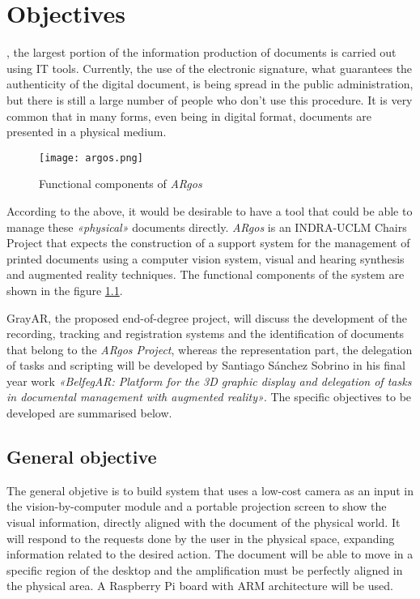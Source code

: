 \chapter{Objectives}
\label{chap:objetivos_eng}

, the largest portion of the information production of documents is carried out using IT tools. Currently, the use of the electronic signature, what guarantees the authenticity of the digital document, is being spread in the public administration, but there is still a large number of people who don't use this procedure. It is very common that in many forms, even being in digital format, documents are presented in a physical medium.

\begin{figure}[h!]
  \begin{center}
      \texttt{[image: argos.png]}
      \caption{Functional components of \textit{ARgos}}
      \label{fig:diagrama_argos_eng}
    \end{center}
\end{figure}

According to the above, it would be desirable to have a tool that could be able to manage these \textit{«physical»} documents directly. \textit{ARgos} is an INDRA-UCLM Chairs Project that expects the construction of a support system for the management of printed documents using a computer vision system, visual and hearing synthesis and augmented reality techniques. The functional components of the system are shown in the figure \ref{fig:diagrama_argos_eng}.

GrayAR, the proposed end-of-degree project, will discuss the development of the recording, tracking and registration systems and the identification of documents that belong to the \textit{ARgos Project}, whereas the representation part, the delegation of tasks and scripting will be developed by Santiago Sánchez Sobrino in his final year work \textit{«BelfegAR: Platform for the 3D graphic display and delegation of tasks in documental management with augmented reality»}. The specific objectives to be developed are summarised below.


\section{General objective}
The general objetive is to build system that uses a low-cost camera as an input in the vision-by-computer module and a portable projection screen to show the visual information, directly aligned with the document of the physical world. It will respond to the requests done by the user in the physical space, expanding information related to the desired action. The document will be able to move in a specific region of the desktop and the amplification must be perfectly aligned in the physical area. A Raspberry Pi board with ARM architecture will be used. 

